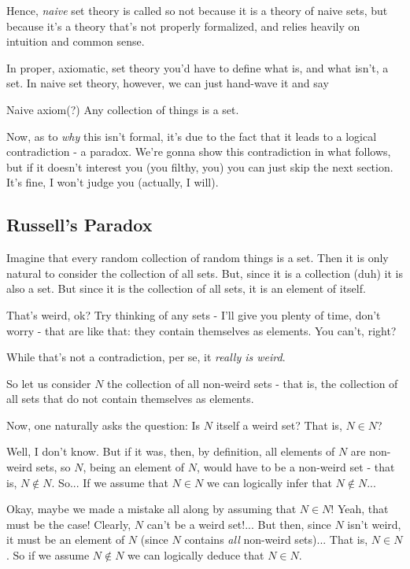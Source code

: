 Hence, \textit{naive} set theory is called so not because it is a theory of naive sets, but because it's a theory that's not properly formalized, and relies heavily on intuition and common sense.

In proper, axiomatic, set theory you'd have to define what is, and what isn't, a set. In naive set theory, however, we can just hand-wave it and say
\begin{blockenv}{Naive axiom(?)}
	Any collection of things is a set.
\end{blockenv}

Now, as to \textit{why} this isn't formal, it's due to the fact that it leads to a logical contradiction - a paradox. We're gonna show this contradiction in what follows, but if it doesn't interest you (you filthy, you) you can just skip the next section. It's fine, I won't judge you (actually, I will).

\subsection{Russell's Paradox}

Imagine that every random collection of random things is a set. Then it is only natural to consider the collection of all sets. But, since it is a collection (duh) it is also a set. But since it is the collection of all sets, it is an element of itself.

That's weird, ok? Try thinking of any sets - I'll give you plenty of time, don't worry - that are like that: they contain themselves as elements. You can't, right?

While that's not a contradiction, per se, it \textit{really is weird}.

So let us consider $N$ the collection of all non-weird sets - that is, the collection of all sets that do not contain themselves as elements.

Now, one naturally asks the question: Is $N$ itself a weird set? That is, $N\in N$?

Well, I don't know. But if it was, then, by definition, all elements of $N$ are non-weird sets, so $N$, being an element of $N$, would have to be a non-weird set - that is, $N\notin N$. So... If we assume that $N\in N$ we can logically infer that $N\notin N$...

Okay, maybe we made a mistake all along by assuming that $N\in N$! Yeah, that must be the case! Clearly, $N$ can't be a weird set!... But then, since $N$ isn't weird, it must be an element of $N$ (since $N$ contains \textit{all} non-weird sets)... That is, $N\in N$. So if we assume $N\notin N$ we can logically deduce that $N\in N$.

